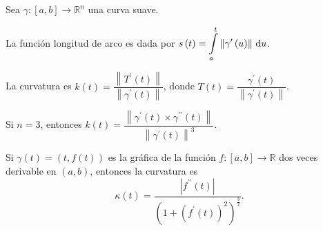 \begin{frame}
    Sea $\gamma\colon\left[a,b\right]\to\mathbb{R}^{n}$ una curva
    suave.
    \begin{definition}
        La función \alert{longitud de arco} es dada por
        \begin{math}
            \displaystyle
            s\left(t\right)=
            \int\limits_{a}^{t}
            \left\|
            \gamma^{\prime}\left(u\right)
            \right\|\dl u
        \end{math}.
    \end{definition}

    \begin{definition}[Curvatura]
        La \alert{curvatura} es
        \begin{math}
            k\left(t\right)=
            \dfrac{
            \left\|T^{\prime}\left(t\right)\right\|
            }{
            \left\|\gamma^{\prime}\left(t\right)\right\|
            }
        \end{math},
        donde
        \begin{math}
            T\left(t\right)=
            \dfrac{
                \gamma^{\prime}\left(t\right)
            }{
                \left\|\gamma^{\prime}\left(t\right)\right\|
            }
        \end{math}.
    \end{definition}

    \begin{theorem}
        Si $n=3$, entonces
        \begin{math}
            k\left(t\right)=
            \dfrac{
                \left\|\gamma^{\prime}\left(t\right)\times\gamma^{\prime\prime}\left(t\right)\right\|
            }{
                {\left\|\gamma^{\prime}\left(t\right)\right\|}^{3}
            }
        \end{math}.
    \end{theorem}

    \begin{theorem}
        Si
        \begin{math}
            \gamma\left(t\right)=
            \left(
            t,
            f\left(t\right)
            \right)
        \end{math}
        es la gráfica de la función
        \begin{math}
            f\colon
            \left[a,b\right]\to
            \mathbb{R}
        \end{math}
        dos veces derivable en
        $\left(a,b\right)$, entonces la curvatura es
        \begin{equation*}
            \kappa\left(t\right)=
            \dfrac{
                \left|
                f^{\prime\prime}\left(t\right)
                \right|
            }{
                {\left(1+{\left(f^{\prime}\left(t\right)\right)}^{2}\right)}^{\frac{3}{2}}
            }.
        \end{equation*}
    \end{theorem}


\end{frame}
